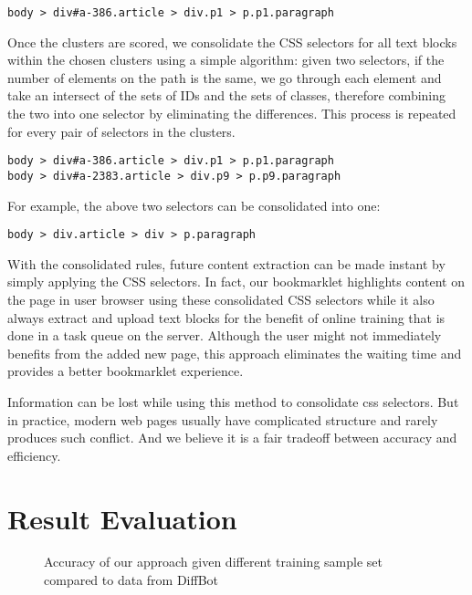 \documentclass{acm_proc_article-sp}
\begin{document}
\begin{verbatim}
body > div#a-386.article > div.p1 > p.p1.paragraph
\end{verbatim}

Once the clusters are scored, we consolidate the CSS selectors for all text blocks within the chosen clusters using a simple algorithm: given two selectors, if the number of elements on the path is the same, we go through each element and take an intersect of the sets of IDs and the sets of classes, therefore combining the two into one selector by eliminating the differences. This process is repeated for every pair of selectors in the clusters.

\begin{verbatim}
body > div#a-386.article > div.p1 > p.p1.paragraph
body > div#a-2383.article > div.p9 > p.p9.paragraph
\end{verbatim}

For example, the above two selectors can be consolidated into one:

\begin{verbatim}
body > div.article > div > p.paragraph
\end{verbatim}

With the consolidated rules, future content extraction can be made instant by simply applying the CSS selectors. In fact, our bookmarklet highlights content on the page in user browser using these consolidated CSS selectors while it also always extract and upload text blocks for the benefit of online training that is done in a task queue on the server. Although the user might not immediately benefits from the added new page, this approach eliminates the waiting time and provides a better bookmarklet experience.

Information can be lost while using this method to consolidate css selectors. But in practice, modern web pages usually have complicated structure and rarely produces such conflict. And we believe it is a fair tradeoff between accuracy and efficiency.

\section{Result Evaluation}

\begin{figure*}
\centering
{}
\caption{Accuracy of our approach given different training sample set compared to data from DiffBot}
\end{figure*}
\end{document}
